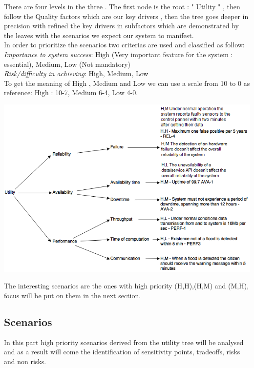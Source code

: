 There are four levels in the three . The first node is the root : " Utility " , then follow the Quality factors which are our key drivers , then the tree goes deeper in precision with refined the key drivers in subfactors which are demonstrated by the leaves with the scenarios we expect our system to manifest. \\

In order to prioritize the scenarios two criterias are used and classified as follow: \\
\textit{Importance  to system success}: High (Very important feature for the system : essential), Medium, Low (Not mandatory)\\
\textit{ Risk/difficulty in achieving}: High, Medium, Low\\
To get the meaning of High , Medium and Low we can use a scale from 10 to 0 as reference: High : 10-7, Medium 6-4, Low 4-0.

\includegraphics[scale=0.8]{images/utilitytree1.png}

The interesting scenarios are the ones with high priority (H,H),(H,M) and (M,H), focus will be put on them in the next section.

\subsection{Scenarios}

In this part high priority scenarios derived from the utility tree will be analysed and as a result will come the identification of sensitivity points, tradeoffs, risks and non risks.



